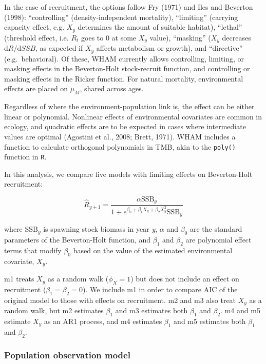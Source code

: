 \documentclass[]{article}
\begin{document}
In the case of recruitment, the options follow Fry (1971) and Iles and
Beverton (1998): ``controlling'' (density-independent mortality),
``limiting'' (carrying capacity effect, e.g. \(X_y\) determines the
amount of suitable habitat), ``lethal'' (threshold effect, i.e. \(R_t\)
goes to 0 at some \(X_y\) value), ``masking'' (\(X_y\) decreases
\(\text{d}R/\text{d}SSB\), as expected if \(X_y\) affects metabolism or
growth), and ``directive'' (e.g.~behavioral). Of these, WHAM currently
allows controlling, limiting, or masking effects in the Beverton-Holt
stock-recruit function, and controlling or masking effects in the Ricker
function. For natural mortality, environmental effects are placed on
\(\mu_M\), shared across ages.

Regardless of where the environment-population link is, the effect can
be either linear or polynomial. Nonlinear effects of environmental
covariates are common in ecology, and quadratic effects are to be
expected in cases where intermediate values are optimal (Agostini et
al., 2008; Brett, 1971). WHAM includes a function to calculate
orthogonal polynomials in TMB, akin to the \texttt{poly()} function in
\texttt{R}.

In this analysis, we compare five models with limiting effects on
Beverton-Holt recruitment:

\[\hat{R}_{y+1} = \frac{\alpha \text{SSB}_{y}}{1 + e^{\beta_0 + \beta_1 X_{y} + \beta_2 X^2_{y}} \text{SSB}_y}\]

where \(\text{SSB}_y\) is spawning stock biomass in year \emph{y},
\(\alpha\) and \(\beta_0\) are the standard parameters of the
Beverton-Holt function, and \(\beta_1\) and \(\beta_2\) are polynomial
effect terms that modify \(\beta_0\) based on the value of the estimated
environmental covariate, \(X_y\).

m1 treats \(X_y\) as a random walk (\(\phi_X = 1\)) but does not include
an effect on recruitment (\(\beta_1 = \beta_2 = 0\)). We include m1 in
order to compare AIC of the original model to those with effects on
recruitment. m2 and m3 also treat \(X_y\) as a random walk, but m2
estimates \(\beta_1\) and m3 estimates both \(\beta_1\) and \(\beta_2\).
m4 and m5 estimate \(X_y\) as an AR1 process, and m4 estimates
\(\beta_1\) and m5 estimates both \(\beta_1\) and \(\beta_2\).

\hypertarget{population-observation-model}{%
\subsubsection{Population observation
model}\label{population-observation-model}}
\end{document}

